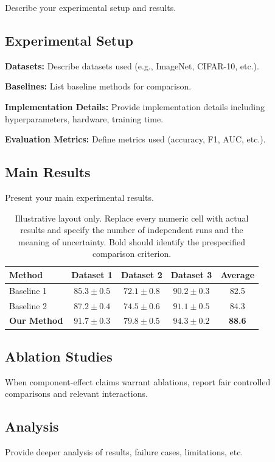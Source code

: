 \documentclass{article}
\begin{document}
Describe your experimental setup and results.

\subsection{Experimental Setup}
\textbf{Datasets:} Describe datasets used (e.g., ImageNet, CIFAR-10, etc.).

\textbf{Baselines:} List baseline methods for comparison.

\textbf{Implementation Details:} Provide implementation details including hyperparameters, hardware, training time.

\textbf{Evaluation Metrics:} Define metrics used (accuracy, F1, AUC, etc.).

\subsection{Main Results}
Present your main experimental results.

\begin{table}[t]
\centering
\caption{Illustrative layout only. Replace every numeric cell with actual results and specify the number of independent runs and the meaning of uncertainty. Bold should identify the prespecified comparison criterion.}
\label{tab:main_results}
\begin{tabular}{lcccc}
\toprule
Method & Dataset 1 & Dataset 2 & Dataset 3 & Average \\
\midrule
Baseline 1 & $85.3 \pm 0.5$ & $72.1 \pm 0.8$ & $90.2 \pm 0.3$ & 82.5 \\
Baseline 2 & $87.2 \pm 0.4$ & $74.5 \pm 0.6$ & $91.1 \pm 0.5$ & 84.3 \\
\textbf{Our Method} & $\mathbf{91.7 \pm 0.3}$ & $\mathbf{79.8 \pm 0.5}$ & $\mathbf{94.3 \pm 0.2}$ & \textbf{88.6} \\
\bottomrule
\end{tabular}
\end{table}

\subsection{Ablation Studies}
When component-effect claims warrant ablations, report fair controlled comparisons and relevant interactions.

\subsection{Analysis}
Provide deeper analysis of results, failure cases, limitations, etc.
\end{document}
